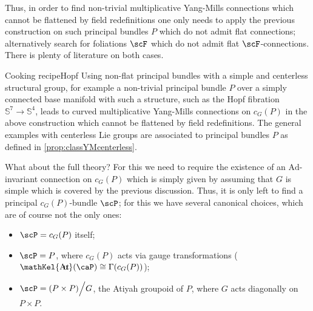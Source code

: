 \documentclass[reqno,a4paper,oneside]{amsart}
\theoremstyle{plain}
\theoremstyle{remark}
\theoremstyle{definition}
\DeclareMathOperator{\sAut}{\mathKel{A\mkern-5.5mu u\mkern-4mu t\mkern-1.5mu}}
\begin{document}
    Thus, in order to find non-trivial multiplicative Yang-Mills connections which cannot be flattened by field redefinitions one only needs to apply the previous construction on such principal bundles $P$ which do not admit flat connections; alternatively search for foliations $\scF$ which do not admit flat $\scF$-connections. There is plenty of literature on both cases.
    
    \begin{examples}{Cooking recipe}{Hopf}
        Using non-flat principal bundles with a simple and centerless structural group, for example a non-trivial principal bundle $P$ over a simply connected base manifold with such a structure, such as the Hopf fibration $\mathbb{S}^7 \to \mathbb{S}^4$, leads to curved multiplicative Yang-Mills connections on $c_G(P)$ in the above construction which cannot be flattened by field redefinitions. The general examples with centerless Lie groups are associated to principal bundles $P$ as defined in \ref{prop:classYMcenterless}.
    \end{examples}
		
		What about the full theory? For this we need to require the existence of an $\mathrm{Ad}$-invariant connection on $c_G(P)$ which is simply given by assuming that $G$ is simple which is covered by the previous discussion. Thus, it is only left to find a principal $c_G(P)$-bundle $\scP$; for this we have several canonical choices, which are of course not the only ones:
		\begin{itemize}
			\item $\scP = c_G(P)$ itself;
			\item $\scP = P$, where $c_G(P)$ acts via gauge transformations ($\sAut(\caP) \cong \Gamma(c_G(P))$);
			\item $\scP = (P \times P) \Big/ G$, the Atiyah groupoid of $P$, where $G$ acts diagonally on $P \times P$.
		\end{itemize}
		
\end{document}
